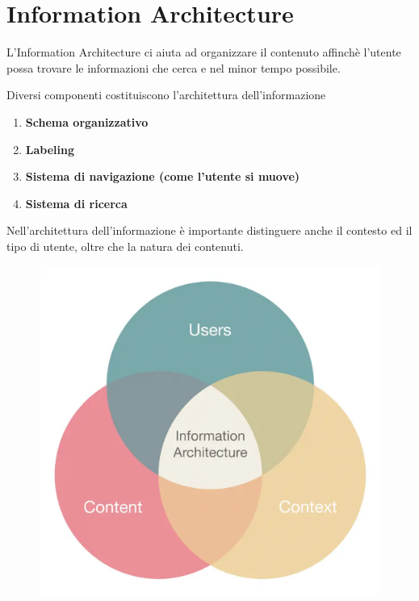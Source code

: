 \section{Information Architecture}

L'Information Architecture ci aiuta ad organizzare il contenuto affinchè l'utente possa trovare le informazioni che cerca e nel minor tempo possibile.

Diversi componenti costituiscono l'architettura dell'informazione

\begin{enumerate}
    \item \textbf{Schema organizzativo}
    \item \textbf{Labeling}
    \item \textbf{Sistema di navigazione (come l'utente si muove)}
    \item \textbf{Sistema di ricerca}
\end{enumerate}

Nell'architettura dell'informazione è importante distinguere anche il contesto ed il tipo di utente, oltre che la natura dei contenuti.

\begin{figure}[!h]
	\centering
	\includegraphics[scale = 0.7]{"immagini/information architecture"}
\end{figure}

